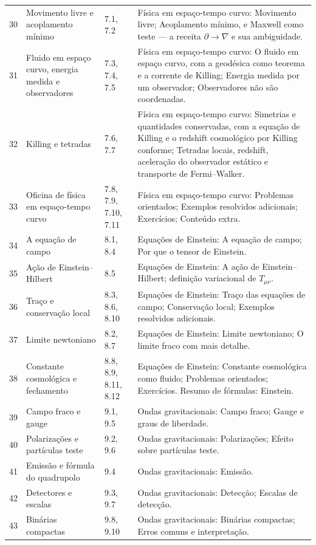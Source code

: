 \documentclass[12pt,a4paper,oneside]{book}
\theoremstyle{rgplain}
\theoremstyle{rgremark}
\begin{document}
\begin{longtable}{cp{3.3cm}p{2.3cm}p{6.1cm}}
30 & Movimento livre e acoplamento mínimo & 7.1, 7.2 & Física em espaço-tempo curvo: Movimento livre; Acoplamento mínimo, e Maxwell como teste --- a receita $\partial\to\nabla$ e sua ambiguidade. \\
31 & Fluido em espaço curvo, energia medida e observadores & 7.3, 7.4, 7.5 & Física em espaço-tempo curvo: O fluido em espaço curvo, com a geodésica como teorema e a corrente de Killing; Energia medida por um observador; Observadores não são coordenadas. \\
32 & Killing e tetradas & 7.6, 7.7 & Física em espaço-tempo curvo: Simetrias e quantidades conservadas, com a equação de Killing e o redshift cosmológico por Killing conforme; Tetradas locais, redshift, aceleração do observador estático e transporte de Fermi--Walker. \\
33 & Oficina de física em espaço-tempo curvo & 7.8, 7.9, 7.10, 7.11 & Física em espaço-tempo curvo: Problemas orientados; Exemplos resolvidos adicionais; Exercícios; Conteúdo extra. \\
34 & A equação de campo & 8.1, 8.4 & Equações de Einstein: A equação de campo; Por que o tensor de Einstein. \\
35 & Ação de Einstein--Hilbert & 8.5 & Equações de Einstein: A ação de Einstein--Hilbert; definição variacional de $T_{\mu\nu}$. \\
36 & Traço e conservação local & 8.3, 8.6, 8.10 & Equações de Einstein: Traço das equações de campo; Conservação local; Exemplos resolvidos adicionais. \\
37 & Limite newtoniano & 8.2, 8.7 & Equações de Einstein: Limite newtoniano; O limite fraco com mais detalhe. \\
38 & Constante cosmológica e fechamento & 8.8, 8.9, 8.11, 8.12 & Equações de Einstein: Constante cosmológica como fluido; Problemas orientados; Exercícios. Resumo de fórmulas: Einstein. \\
39 & Campo fraco e gauge & 9.1, 9.5 & Ondas gravitacionais: Campo fraco; Gauge e graus de liberdade. \\
40 & Polarizações e partículas teste & 9.2, 9.6 & Ondas gravitacionais: Polarizações; Efeito sobre partículas teste. \\
41 & Emissão e fórmula do quadrupolo & 9.4 & Ondas gravitacionais: Emissão. \\
42 & Detectores e escalas & 9.3, 9.7 & Ondas gravitacionais: Detecção; Escalas de detecção. \\
43 & Binárias compactas & 9.8, 9.10 & Ondas gravitacionais: Binárias compactas; Erros comuns e interpretação. \\

\end{longtable}
\end{document}
